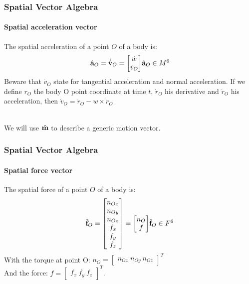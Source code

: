 \documentclass{beamer}
\begin{document}
  	\begin{frame}
		\frametitle{Spatial Vector Algebra}
		\framesubtitle{Spatial acceleration vector}
		The spatial acceleration of a point $ O $ of a body is:
		\begin{subequations}
			$$
			\accelvecHatOrigin{O} = \velocityvecDotHatOrigin{O} = \begin{bmatrix} \dot{w} \\ \dot{v}_O \end{bmatrix}
			$$
			$$
			\accelvecHatOrigin{O} \in \motionspace{6}
			$$
		\end{subequations}
		Beware that $ \dot{v}_O $ state for tangential acceleration and normal acceleration.
		If we define $ r_O $ the body O point coordinate at time $ t $, $ \dot{r}_O $ his derivative and $ \ddot{r}_O $ his acceleration, then $ \dot{v}_O = \ddot{r}_O - w \times \dot{r}_O $ 

		\hfill \\
		We will use $ \hat{\mathbf{m}} $ to describe a generic motion vector.
	\end{frame}


  	\begin{frame}
		\frametitle{Spatial Vector Algebra}
		\framesubtitle{Spatial force vector}
		The spatial force of a point $ O $ of a body is:
		\begin{subequations}
			$$
			\forcevecHatOrigin{O} = \begin{bmatrix} n_{Ox} \\ n_{Oy} \\ n_{Oz} \\ f_x \\ f_y \\ f_z \end{bmatrix} = \begin{bmatrix} n_O \\ f \end{bmatrix}
			$$
			$$
			\forcevecHatOrigin{O} \in \forcespace{6}
			$$
		\end{subequations}
		With the torque at point O:
		$ n_O = \begin{bmatrix} n_{Ox}\ n_{Oy}\ n_{Oz} \end{bmatrix}^T $\\
	        And the force:	
		$ f = \begin{bmatrix} f_x\ f_y\ f_z \end{bmatrix}^T $.
	\end{frame}
\end{document}
